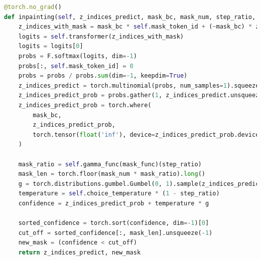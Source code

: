 \begin{lstlisting}[language=Python, caption=Inpainting 函數實作]
@torch.no_grad()
def inpainting(self, z_indices_predict, mask_bc, mask_num, step_ratio, mask_func):
    z_indices_with_mask = mask_bc * self.mask_token_id + (~mask_bc) * z_indices_predict
    logits = self.transformer(z_indices_with_mask)
    logits = logits[0]
    probs = F.softmax(logits, dim=-1)
    probs[:, self.mask_token_id] = 0
    probs = probs / probs.sum(dim=-1, keepdim=True)
    z_indices_predict = torch.multinomial(probs, num_samples=1).squeeze(-1)
    z_indices_predict_prob = probs.gather(1, z_indices_predict.unsqueeze(-1)).squeeze(-1)
    z_indices_predict_prob = torch.where(
        mask_bc,
        z_indices_predict_prob,
        torch.tensor(float('inf'), device=z_indices_predict_prob.device)
    )

    mask_ratio = self.gamma_func(mask_func)(step_ratio)
    mask_len = torch.floor(mask_num * mask_ratio).long()
    g = torch.distributions.gumbel.Gumbel(0, 1).sample(z_indices_predict_prob.shape).to(z_indices_predict_prob.device)
    temperature = self.choice_temperature * (1 - step_ratio)
    confidence = z_indices_predict_prob + temperature * g
    
    sorted_confidence = torch.sort(confidence, dim=-1)[0]
    cut_off = sorted_confidence[:, mask_len].unsqueeze(-1)
    new_mask = (confidence < cut_off)
    return z_indices_predict, new_mask
\end{lstlisting}


